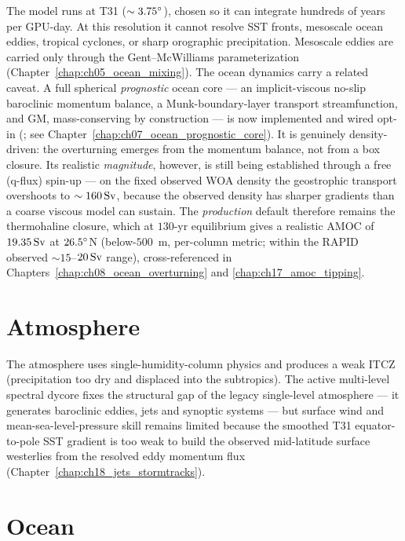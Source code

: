 The model runs at T31 ($\sim 3.75^{\circ}$), chosen so it can integrate hundreds of
years per GPU-day. At this resolution it cannot resolve SST fronts, mesoscale
ocean eddies, tropical cyclones, or sharp orographic precipitation. Mesoscale
eddies are carried only through the Gent--McWilliams parameterization
(Chapter~\ref{chap:ch05_ocean_mixing}). The ocean dynamics carry a related
caveat. A full spherical \emph{prognostic} ocean core --- an implicit-viscous
no-slip baroclinic momentum balance, a Munk-boundary-layer transport
streamfunction, and GM, mass-conserving by construction --- is now implemented
and wired opt-in (; see
Chapter~\ref{chap:ch07_ocean_prognostic_core}). It is genuinely density-driven:
the overturning emerges from the momentum balance, not from a box closure. Its
realistic \emph{magnitude}, however, is still being established through a free
(q-flux) spin-up --- on the fixed observed WOA density the geostrophic transport
overshoots to $\sim 160\,\mathrm{Sv}$, because the observed density has sharper gradients
than a coarse viscous model can sustain. The \emph{production} default therefore
remains the thermohaline closure, which at $130$-yr equilibrium gives a realistic
AMOC of $19.35\,\mathrm{Sv}$ at $26.5^{\circ}$N (below-$500$~m, per-column metric; within the
RAPID observed $\sim 15$--$20\,\mathrm{Sv}$ range), cross-referenced in
Chapters~\ref{chap:ch08_ocean_overturning} and \ref{chap:ch17_amoc_tipping}.

\section{Atmosphere}\label{sec:appE_atmosphere}

The atmosphere uses single-humidity-column physics and produces a weak ITCZ
(precipitation too dry and displaced into the subtropics). The active multi-level
\dino{} spectral dycore fixes the structural gap of the legacy single-level
atmosphere --- it generates baroclinic eddies, jets and synoptic systems --- but
surface wind and mean-sea-level-pressure skill remains limited because the smoothed
T31 equator-to-pole SST gradient is too weak to build the observed mid-latitude
surface westerlies from the resolved eddy momentum flux
(Chapter~\ref{chap:ch18_jets_stormtracks}).

\section{Ocean}\label{sec:appE_ocean}

